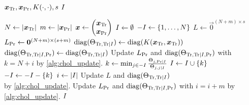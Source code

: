 \begin{algorithmic}[1]
  \REQUIRE \( \bm{x}_{\text{Tr}}, \bm{x}_{\text{Pr}}, K(\cdot, \cdot), s \)
  \ENSURE \( I \)

  \STATE \( N \gets \lvert\bm{x}_{\text{Tr}}\rvert \)
  \STATE \( m \gets \lvert\bm{x}_{\text{Pr}}\rvert \)
  \STATE \(
    \bm{x} \gets
    \begin{pmatrix}
      \bm{x}_{\text{Tr}} \\
      \bm{x}_{\text{Pr}}
    \end{pmatrix}
  \)
  \STATE \( I \gets \emptyset \)
  \STATE \( -I \gets \{ 1, \dotsc, N \} \)
  \STATE \( L \gets \vec{0}^{(N + m) \times s} \)
  \STATE \( L_{\text{Pr}} \gets \bm{0}^{(N + m) \times (s + m)} \)
  \STATE \(
    \operatorname{diag}(\Theta_{\text{Tr}, \text{Tr} \mid I}) \gets
    \operatorname{diag}(K(\bm{x}_{\text{Tr}}, \bm{x}_{\text{Tr}}))
  \)
  \STATE \(
    \operatorname{diag}(\Theta_{\text{Tr}, \text{Tr} \mid I, \text{Pr}}) \gets
    \operatorname{diag}(\Theta_{\text{Tr}, \text{Tr} \mid I})
  \)
    \STATE Update \( L_{\text{Pr}} \) and \( \operatorname{diag}(\Theta_{\text{Tr}, \text{Tr}
      \mid I, \text{Pr}}) \) with \( k = N + i \) by \cref{alg:chol_update}.
  \ENDFOR
    \STATE \(
      k \gets \min_{j \in -I}
      \frac{\Theta_{j, \text{Pr} \mid I}}{\Theta_{j, j \mid I}}
    \)
    \STATE \( I \gets I \cup \{ k \} \)
    \STATE \( -I \gets -I - \{ k \} \)
    \STATE \( i \gets \lvert I\rvert \)
    \STATE Update \( L \) and \( \operatorname{diag}(\Theta_{\text{Tr}, \text{Tr}
      \mid I}) \) \\ by \cref{alg:chol_update}.
    \STATE Update \( L_{\text{Pr}} \) and \( \operatorname{diag}(\Theta_{\text{Tr}, \text{Tr}
      \mid I, \text{Pr}}) \) with \( i = i + m \) by \cref{alg:chol_update}.
  \ENDWHILE
  \RETURN \( I \)
\end{algorithmic}
